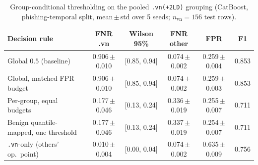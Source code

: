 \begin{table}[t]
\centering
\caption{Group-conditional thresholding on the pooled \texttt{.vn(+2LD)} grouping
(CatBoost, phishing-temporal split, mean\,$\pm$\,std over 5 seeds;
$n_{\text{vn}}=156$ test rows).}
\label{tab:groupthr}
\small\setlength{\tabcolsep}{4pt}
\begin{tabular}{l c c c c c}
\toprule
Decision rule & FNR .vn & {\scriptsize Wilson 95\%} & FNR other & FPR & F1 \\
\midrule
Global $0.5$ (baseline) & 0.906{\scriptsize\,$\pm$0.010} & {\scriptsize[0.85, 0.94]} & 0.074{\scriptsize\,$\pm$0.002} & 0.259{\scriptsize\,$\pm$0.004} & 0.853 \\
Global, matched FPR budget & 0.906{\scriptsize\,$\pm$0.010} & {\scriptsize[0.85, 0.94]} & 0.074{\scriptsize\,$\pm$0.002} & 0.259{\scriptsize\,$\pm$0.003} & 0.853 \\
Per-group, equal budgets & 0.177{\scriptsize\,$\pm$0.046} & {\scriptsize[0.13, 0.24]} & 0.336{\scriptsize\,$\pm$0.019} & 0.255{\scriptsize\,$\pm$0.007} & 0.711 \\
Benign quantile-mapped, one threshold & 0.177{\scriptsize\,$\pm$0.046} & {\scriptsize[0.13, 0.24]} & 0.337{\scriptsize\,$\pm$0.019} & 0.254{\scriptsize\,$\pm$0.007} & 0.711 \\
\texttt{.vn}-only (others' op.\ point) & 0.010{\scriptsize\,$\pm$0.004} & {\scriptsize[0.00, 0.04]} & 0.074{\scriptsize\,$\pm$0.002} & 0.635{\scriptsize\,$\pm$0.009} & 0.756 \\
\bottomrule
\end{tabular}
\end{table}
